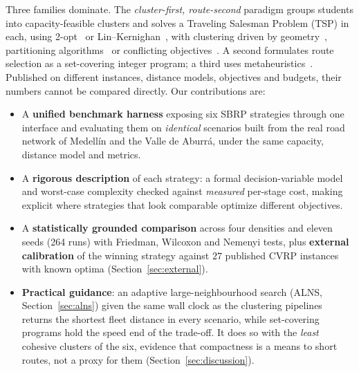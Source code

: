 \documentclass[graybox]{SNmult}
\begin{document}
Three families dominate. The \emph{cluster-first, route-second}
paradigm groups students into capacity-feasible clusters and solves a
Traveling Salesman Problem (TSP) in each, using
2-opt~\cite{Croes1958TwoOpt} or Lin--Kernighan~\cite{HelsgaunAnHeuristic},
with clustering driven by geometry~\cite{CakirRevisitingProblem},
partitioning algorithms~\cite{Comert2018AStudy} or conflicting
objectives~\cite{Corberan2002HeuristicObjectives}. A second formulates
route selection as a set-covering integer program; a
third uses metaheuristics~\cite{Baranwal2016DAVRPTW,Hatamlou2018BlackHole}.
Published on different instances, distance models, objectives and budgets,
their numbers cannot be compared directly. Our contributions are:

\begin{itemize}
\item A \textbf{unified benchmark harness} exposing six SBRP strategies
through one interface and evaluating them on \emph{identical} scenarios
built from the real road network of Medell\'in and the Valle de Aburr\'a,
under the same capacity, distance model and metrics.
\item A \textbf{rigorous description} of each strategy: a formal
decision-variable model and worst-case complexity checked against
\emph{measured} per-stage cost, making explicit where strategies that look
comparable optimize different objectives.
\item A \textbf{statistically grounded comparison} across four densities
and eleven seeds (264 runs) with Friedman, Wilcoxon and Nemenyi tests,
plus \textbf{external calibration} of the winning strategy against $27$
published CVRP instances with known optima (Section~\ref{sec:external}).
\item \textbf{Practical guidance}: an adaptive large-neighbourhood search
(ALNS, Section~\ref{sec:alns}) given the same wall clock as the clustering
pipelines returns the shortest fleet distance in every scenario, while
set-covering programs hold the speed end of the trade-off. It does so
with the \emph{least} cohesive clusters of the six, evidence that
compactness is a means to short routes, not a proxy for them
(Section~\ref{sec:discussion}).
\end{itemize}
\end{document}

